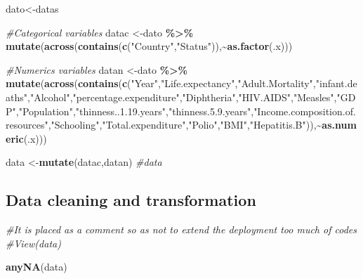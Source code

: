\documentclass[
]{article}
\newenvironment{Shaded}{\begin{snugshade}}{\end{snugshade}}
\newcommand{\CommentTok}[1]{\textcolor[rgb]{0.56,0.35,0.01}{\textit{#1}}}
\newcommand{\FunctionTok}[1]{\textcolor[rgb]{0.13,0.29,0.53}{\textbf{#1}}}
\newcommand{\NormalTok}[1]{#1}
\newcommand{\OtherTok}[1]{\textcolor[rgb]{0.56,0.35,0.01}{#1}}
\newcommand{\SpecialCharTok}[1]{\textcolor[rgb]{0.81,0.36,0.00}{\textbf{#1}}}
\newcommand{\StringTok}[1]{\textcolor[rgb]{0.31,0.60,0.02}{#1}}
\begin{document}
\begin{Shaded}
\begin{Highlighting}[]
\NormalTok{dato}\OtherTok{\textless{}{-}}\NormalTok{datas}


\CommentTok{\#Categorical variables}
\NormalTok{datac }\OtherTok{\textless{}{-}}\NormalTok{dato }\SpecialCharTok{\%\textgreater{}\%} \FunctionTok{mutate}\NormalTok{(}\FunctionTok{across}\NormalTok{(}\FunctionTok{contains}\NormalTok{(}\FunctionTok{c}\NormalTok{(}\StringTok{"Country"}\NormalTok{,}\StringTok{"Status"}\NormalTok{)),}\SpecialCharTok{\textasciitilde{}}\FunctionTok{as.factor}\NormalTok{(.x)))}

\CommentTok{\#Numerics variables}
\NormalTok{datan }\OtherTok{\textless{}{-}}\NormalTok{dato }\SpecialCharTok{\%\textgreater{}\%} \FunctionTok{mutate}\NormalTok{(}\FunctionTok{across}\NormalTok{(}\FunctionTok{contains}\NormalTok{(}\FunctionTok{c}\NormalTok{(}\StringTok{"Year"}\NormalTok{,}\StringTok{"Life.expectancy"}\NormalTok{,}\StringTok{"Adult.Mortality"}\NormalTok{,}\StringTok{"infant.deaths"}\NormalTok{,}\StringTok{"Alcohol"}\NormalTok{,}\StringTok{"percentage.expenditure"}\NormalTok{,}\StringTok{"Diphtheria"}\NormalTok{,}\StringTok{"HIV.AIDS"}\NormalTok{,}\StringTok{"Measles"}\NormalTok{,}\StringTok{"GDP"}\NormalTok{,}\StringTok{"Population"}\NormalTok{,}\StringTok{"thinness..1.19.years"}\NormalTok{,}\StringTok{"thinness.5.9.years"}\NormalTok{,}\StringTok{"Income.composition.of.resources"}\NormalTok{,}\StringTok{"Schooling"}\NormalTok{,}\StringTok{"Total.expenditure"}\NormalTok{,}\StringTok{"Polio"}\NormalTok{,}\StringTok{"BMI"}\NormalTok{,}\StringTok{"Hepatitis.B"}\NormalTok{)),}\SpecialCharTok{\textasciitilde{}}\FunctionTok{as.numeric}\NormalTok{(.x)))}

\NormalTok{data }\OtherTok{\textless{}{-}}\FunctionTok{mutate}\NormalTok{(datac,datan)}
\CommentTok{\#data}
\end{Highlighting}
\end{Shaded}

\subsection{Data cleaning and
transformation}\label{data-cleaning-and-transformation}

\begin{Shaded}
\begin{Highlighting}[]
\CommentTok{\#It is placed as a comment so as not to extend the deployment too much of codes}
\CommentTok{\#View(data)}

\FunctionTok{anyNA}\NormalTok{(data)}
\end{Highlighting}
\end{Shaded}
\end{document}
